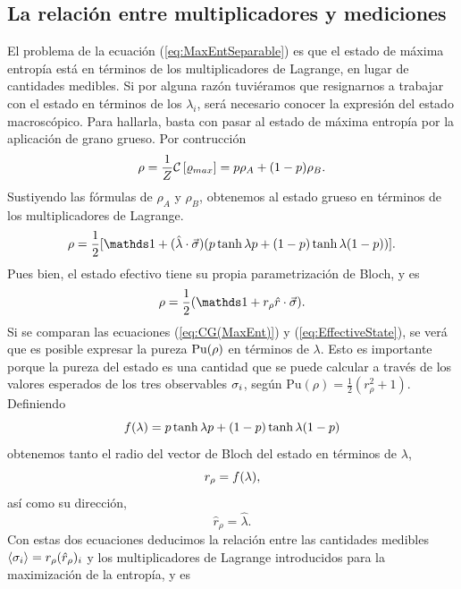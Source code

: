 \subsection{La relación entre multiplicadores y mediciones}


El problema de la ecuación (\ref{eq:MaxEntSeparable}) es que el estado de máxima entropía está en términos de los multiplicadores de Lagrange, en lugar de cantidades medibles. Si por alguna razón tuviéramos que resignarnos a trabajar con el estado en términos de los $\lambda_{i}$, será necesario conocer la expresión del estado macroscópico. Para hallarla, basta con pasar al estado de máxima entropía por la aplicación de grano grueso. Por contrucción 
\begin{equation*}
    \rho=\frac{1}{Z}\mathcal{C}\left[\varrho_{max}\right]=p\rho_{A}+(1-p)\rho_{B}.
\end{equation*}
Sustiyendo las fórmulas de $\rho_{A}$ y $\rho_{B}$, obtenemos al estado grueso en términos de los multiplicadores de Lagrange.
\begin{equation}\label{eq:CG(MaxEnt)}
  \rho=\frac{1}{2}[\Id+(\paulivec{\lambda})(p\tanh{\lambda p}+(1-p)\tanh{\lambda (1-p)})].
\end{equation}
Pues bien, el estado efectivo tiene su propia parametrización de Bloch, y es
\begin{equation}\label{eq:EffectiveState}
    \rho=\frac{1}{2}(\Id+r_{\rho}\paulivec{r}).
\end{equation}
Si se comparan las ecuaciones (\ref*{eq:CG(MaxEnt)}) y (\ref*{eq:EffectiveState}), se verá que es posible expresar la pureza $\text{Pu}(\rho)$ en términos de $\lambda$. Esto es importante porque la pureza del estado es una cantidad que se puede calcular a través de los valores esperados de los tres observables $\sigma_{i}$, según $\text{Pu}(\rho)=\frac{1}{2}(r_{\rho}^{2}+1)$. Definiendo
\begin{equation}\label{eq:r(lambda)}
    f(\lambda)=p\tanh{\lambda p}+(1-p)\tanh{\lambda (1-p)}
\end{equation}
obtenemos tanto el radio del vector de Bloch del estado en términos de $\lambda$,
\begin{equation*}
    r_{\rho}=f(\lambda),
\end{equation*}
así como su dirección,
\begin{equation*}
    \hat{r}_{\rho}=\hat{\lambda}.
\end{equation*}
Con estas dos ecuaciones deducimos la relación entre las cantidades medibles $\expval{\sigma_{i}}=r_{\rho}(\hat{r}_{\rho})_{i}$ y los multiplicadores de Lagrange introducidos para la maximización de la entropía, y es
